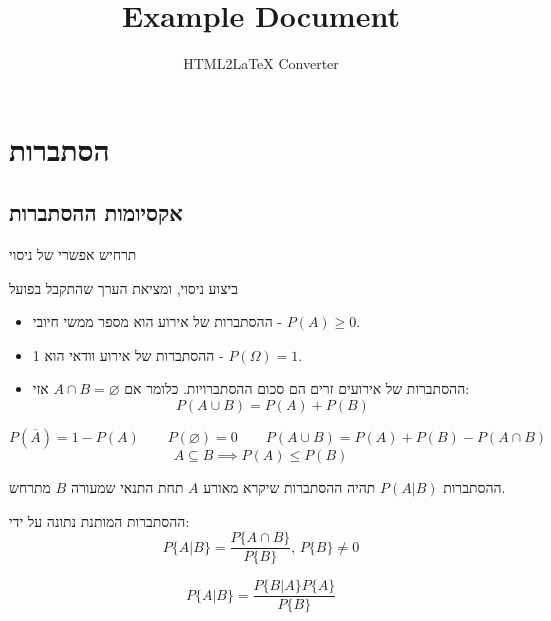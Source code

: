 \documentclass{tstextbook}
\begin{document}
\title{Example Document}
\author{HTML2LaTeX Converter}
\maketitle

\section{הסתברות}

\subsection{אקסיומות ההסתברות}

\begin{definition}[אירוע]
תרחיש אפשרי של ניסוי

\end{definition}
\begin{definition}[מדידה]
ביצוע ניסוי, ומציאת הערך שהתקבל בפועל

\end{definition}
\begin{definition}
  \begin{itemize}
    \item ההסתברות של אירוע הוא מספר ממשי חיובי - \(P(A)\geq 0\).
    \item ההסתברות של אירוע וודאי הוא 1 - \(P\left( \Omega \right)=1\).
    \item ההסתברות של אירועים זרים הם סכום ההסתברויות. כלומר אם \(A\cap B = \varnothing\) אזי:
$$P\left( A\cup B \right)=P(A)+P(B)$$
  \end{itemize}
\end{definition}
\begin{corollary}
$$P\left( \overline{A}  \right)=1-P(A)\qquad P\left( \varnothing  \right)=0\qquad P\left( A\cup B \right)=P(A)+P(B)-P\left( A\cap B \right)$$$$A\subseteq B\implies P(A)\leq P(B)$$

\end{corollary}
\begin{definition}
ההסתברות \(P(A|B)\) תהיה ההסתברות שיקרא מאורע \(A\) תחת התנאי שמעורה \(B\) מתרחש.

\end{definition}
\begin{proposition}
ההסתברות המותנת נתונה על ידי:
$$P\{A|B\}={\frac{P\{A\cap B\}}{P\{B\}}},\,P\{B\}\neq0$$

\end{proposition}
\begin{corollary}
$$P\{A|B\}={\frac{P\{B|A\}P\{A\}}{P\{B\}}}$$

\end{corollary}
\end{document}
